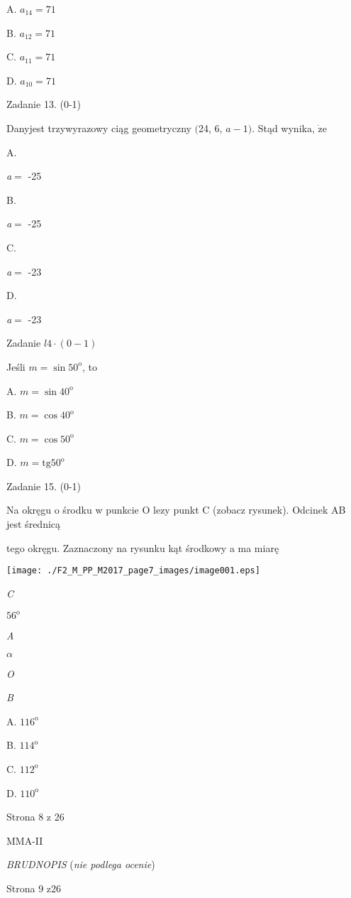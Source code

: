 \documentclass[a4paper,12pt]{article}
\begin{document}
A. $a_{14}=71$

B. $a_{12}=71$

C. $a_{11}=71$

D. $a_{10}=71$

Zadanie 13. (0-1)

Danyjest trzywyrazowy ciąg geometryczny $($24, 6, $a-1)$. Stąd wynika, $\dot{\mathrm{z}}\mathrm{e}$

A.

{\it a}$=$ -25

B.

{\it a}$=$ -25

C.

{\it a}$=$ -23

D.

{\it a}$=$ -23

Zadanie $l4\cdot(0-1)$

Jeśli $m=\sin 50^{\mathrm{o}}$, to

A. $m=\sin 40^{\mathrm{o}}$

B. $m=\cos 40^{\mathrm{o}}$

C. $m=\cos 50^{\mathrm{o}}$

D. $m=\mathrm{t}\mathrm{g}50^{\mathrm{o}}$

Zadanie 15. (0-1)

Na okręgu o środku w punkcie O lezy punkt C (zobacz rysunek). Odcinek AB jest średnicą

tego okręgu. Zaznaczony na rysunku kąt środkowy a ma miarę
\begin{center}
\texttt{[image: ./F2\_M\_PP\_M2017\_page7\_images/image001.eps]}
\end{center}
{\it C}

$56^{\mathrm{o}}$

{\it A}

$\alpha$

{\it O}

{\it B}

A. $116^{\mathrm{o}}$

B. $114^{\mathrm{o}}$

C. $112^{\mathrm{o}}$

D. $110^{\mathrm{o}}$

Strona 8 z 26

MMA-II





{\it BRUDNOPIS} ({\it nie podlega ocenie})

Strona 9 z26
\end{document}
